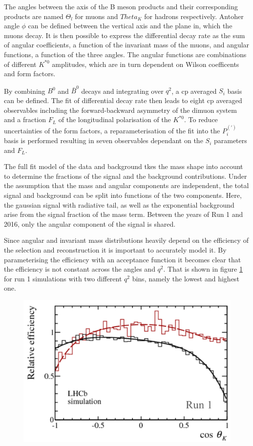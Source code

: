 \documentclass[%
 reprint,
 amsmath,amssymb,
 aps,
]{revtex4-2}
\begin{document}
The angles between the axis of the B meson products and their corresponding products are named $\Theta_l$
for muons and $Theta_K$ for hadrons respectively. Antoher angle $\phi$ can be defined between the vertical axis and the plane in,
which the muons decay.
It is then possible to express the differential decay rate as
the sum of angular coefficients, a function of the invariant mass of the muons, and angular functions, a function of the three angles.
The angular functions are combinations of different $K^{*0}$ amplitudes, which are in turn dependent on Wilson coefficents
and form factors.

By combining $B^0$ and $\bar{B}^0$ decays and integrating over $q^2$, a cp averaged $S_i$ basis can be defined.
The fit of differential decay rate then leads to eight cp averaged observables including the forward-backward asymmetry of
the dimuon system and a fraction $F_L$ of the longitudinal polarisation of the $K^{*0}$.
To reduce uncertainties of the form factors, a reparameterisation of the fit into the $P^{(')}_i$ basis is performed resulting
in seven observables dependant on the $S_i$ parameters and $F_L$.

The full fit model of the data and background tkes the mass shape into account to determine the fractions of the signal and
the background contributions. Under the assumption that the mass and angular components are independent, the total
signal and background can be split into functions of the two components. Here, the gaussian signal with radiative tail, as well
as the exponential background arise from the signal fraction of the mass term.
Between the years of Run 1 and 2016, only the angular component of the signal is shared.

Since angular and invariant mass distributions heavily depend on the efficiency of the selection and reconstruction it is
important to accurately model it. By parameterising the efficiency with an acceptance function it becomes clear that the
efficiency is not constant across the angles and $q^2$. That is shown in figure \ref{fig:efficiency} for run 1 simulations with two different $q^2$ bins, namely the lowest and highest one.

\begin{figure}[b]
\includegraphics{efficiency}
\caption{\label{fig:efficiency}}
\end{figure}
\end{document}
